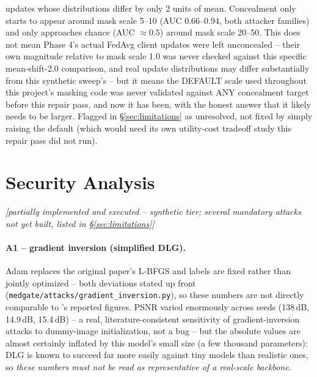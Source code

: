 \documentclass[11pt]{article}
\newcommand{\status}[1]{\textit{[#1]}}
\begin{document}
updates whose distributions differ by only 2 units of mean. Concealment
only starts to appear around mask scale 5--10 (AUC 0.66--0.94, both
attacker families) and only approaches chance (AUC $\approx 0.5$) around
mask scale 20--50. This does not mean Phase 4's actual FedAvg client
updates were left unconcealed -- their own magnitude relative to mask
scale 1.0 was never checked against this specific mean-shift-2.0
comparison, and real update distributions may differ substantially from
this synthetic sweep's -- but it means the DEFAULT scale used throughout
this project's masking code was never validated against ANY concealment
target before this repair pass, and now it has been, with the honest
answer that it likely needs to be larger. Flagged in
\S\ref{sec:limitations} as unresolved, not fixed by simply raising the
default (which would need its own utility-cost tradeoff study this repair
pass did not run).

\section{Security Analysis}
\label{sec:security}
\status{partially implemented and executed -- synthetic tier; several
mandatory attacks not yet built, listed in \S\ref{sec:limitations}}

\resizebox{\textwidth}{!}{}
\label{tab:phase3}

\paragraph{A1 -- gradient inversion (simplified DLG).} Adam replaces the
original paper's L-BFGS and labels are fixed rather than jointly optimized
-- both deviations stated up front (\texttt{medgate/attacks/gradient\_inversion.py}),
so these numbers are not directly comparable to \citet{zhu2019deep}'s
reported figures. PSNR varied enormously across seeds (138\,dB, 14.9\,dB,
15.4\,dB) -- a real, literature-consistent sensitivity of gradient-inversion
attacks to dummy-image initialization, not a bug -- but the absolute values
are almost certainly inflated by this model's small size (a few thousand
parameters): DLG is known to succeed far more easily against tiny models
than realistic ones, so \emph{these numbers must not be read as
representative of a real-scale backbone}.
\end{document}
